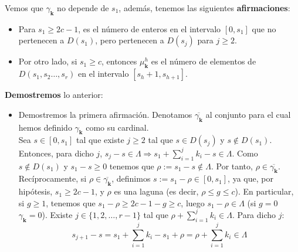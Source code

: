\documentclass[11pt,spanish]{book}
\begin{document}
Vemos que $\gamma_{\mathbf{k}}$ no depende de $s_1$, además, tenemos las siguientes \textbf{afirmaciones}:
\begin{itemize}
    \item Para $s_1\geq 2c-1$, es el número de enteros en el intervalo $[0,s_1]$ que no pertenecen a $D(s_1)$, pero pertenecen a $D(s_j)$ para $j\geq 2$. 
    \item Por otro lado, si $s_1\geq c$, entonces $\mu_{\mathbf{k}}^h$ es el número de elementos de $D(s_1,s_2\ldots,s_r)$ en el intervalo $[s_h+1,s_{h+1}]$.
\end{itemize}
\textbf{Demostremos} lo anterior:
\begin{itemize}
    \item Demostremos la primera afirmación. Denotamos $\overline{\gamma_{\mathbf{k}}}$ al conjunto para el cual hemos definido $\gamma_{\mathbf{k}}$ como su cardinal.\\ 
    Sea $s\in[0,s_1]$ tal que existe $j\geq 2$ tal que $s\in D(s_j)$ y $s\notin D(s_1)$. Entonces, para dicho $j$, $s_j-s\in \Lambda\Rightarrow s_1+\sum_{i=1}^{j}k_i -s\in \Lambda$. Como $s\notin D(s_1)$ y $s_1-s\geq 0$ tenemos que $\rho:=s_1-s\notin \Lambda$. Por tanto, $\rho \in \overline{\gamma_{\mathbf{k}}}$.\\
    Recíprocamente, si $\rho\in\overline{\gamma_{\mathbf{k}}}$, definimos $s:=s_1-\rho\in [0,s_1]$, ya que, por hipótesis, $s_1\geq 2c-1$, y $\rho$ es una laguna (es decir, $\rho\leq g\leq c$). En particular, si $g\geq 1$, tenemos que $s_1-\rho\geq 2c-1-g\geq c$, luego $s_1-\rho\in \Lambda$ (si $g=0$ $\gamma_{\mathbf{k}}=0$). Existe $j\in\{1,2,\ldots,r-1\}$ tal que $\rho+\sum_{i=1}^j k_i\in \Lambda$. Para dicho $j$:
    $$s_{j+1}-s=s_1+\sum_{i=1}^j k_i-s_1+\rho=\rho+\sum_{i=1}^j k_i\in \Lambda$$


\end{itemize}
\end{document}
